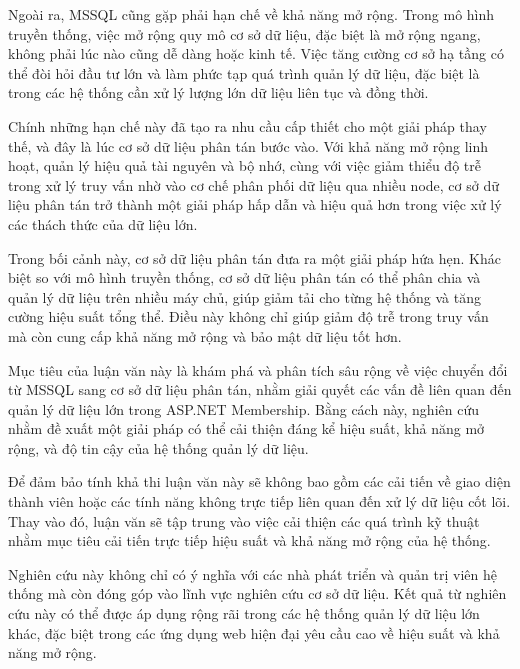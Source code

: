 Ngoài ra, MSSQL cũng gặp phải hạn chế về khả năng mở rộng. Trong mô hình truyền thống, việc mở rộng quy mô cơ sở dữ liệu, đặc biệt là mở rộng ngang, không phải lúc nào cũng dễ dàng hoặc kinh tế. Việc tăng cường cơ sở hạ tầng có thể đòi hỏi đầu tư lớn và làm phức tạp quá trình quản lý dữ liệu, đặc biệt là trong các hệ thống cần xử lý lượng lớn dữ liệu liên tục và đồng thời.

Chính những hạn chế này đã tạo ra nhu cầu cấp thiết cho một giải pháp thay thế, và đây là lúc cơ sở dữ liệu phân tán bước vào. Với khả năng mở rộng linh hoạt, quản lý hiệu quả tài nguyên và bộ nhớ, cùng với việc giảm thiểu độ trễ trong xử lý truy vấn nhờ vào cơ chế phân phối dữ liệu qua nhiều node, cơ sở dữ liệu phân tán trở thành một giải pháp hấp dẫn và hiệu quả hơn trong việc xử lý các thách thức của dữ liệu lớn.

Trong bối cảnh này, cơ sở dữ liệu phân tán đưa ra một giải pháp hứa hẹn. Khác biệt so với mô hình truyền thống, cơ sở dữ liệu phân tán có thể phân chia và quản lý dữ liệu trên nhiều máy chủ, giúp giảm tải cho từng hệ thống và tăng cường hiệu suất tổng thể. Điều này không chỉ giúp giảm độ trễ trong truy vấn mà còn cung cấp khả năng mở rộng và bảo mật dữ liệu tốt hơn.

Mục tiêu của luận văn này là khám phá và phân tích sâu rộng về việc chuyển đổi từ MSSQL sang cơ sở dữ liệu phân tán, nhằm giải quyết các vấn đề liên quan đến quản lý dữ liệu lớn trong ASP.NET Membership. Bằng cách này, nghiên cứu nhằm đề xuất một giải pháp có thể cải thiện đáng kể hiệu suất, khả năng mở rộng, và độ tin cậy của hệ thống quản lý dữ liệu.

Để đảm bảo tính khả thi luận văn này sẽ không bao gồm các cải tiến về giao diện thành viên hoặc các tính năng không trực tiếp liên quan đến xử lý dữ liệu cốt lõi. Thay vào đó, luận văn sẽ tập trung vào việc cải thiện các quá trình kỹ thuật nhằm mục tiêu cải tiến trực tiếp hiệu suất và khả năng mở rộng của hệ thống.


Nghiên cứu này không chỉ có ý nghĩa với các nhà phát triển và quản trị viên hệ thống mà còn đóng góp vào lĩnh vực nghiên cứu cơ sở dữ liệu. Kết quả từ nghiên cứu này có thể được áp dụng rộng rãi trong các hệ thống quản lý dữ liệu lớn khác, đặc biệt trong các ứng dụng web hiện đại yêu cầu cao về hiệu suất và khả năng mở rộng.